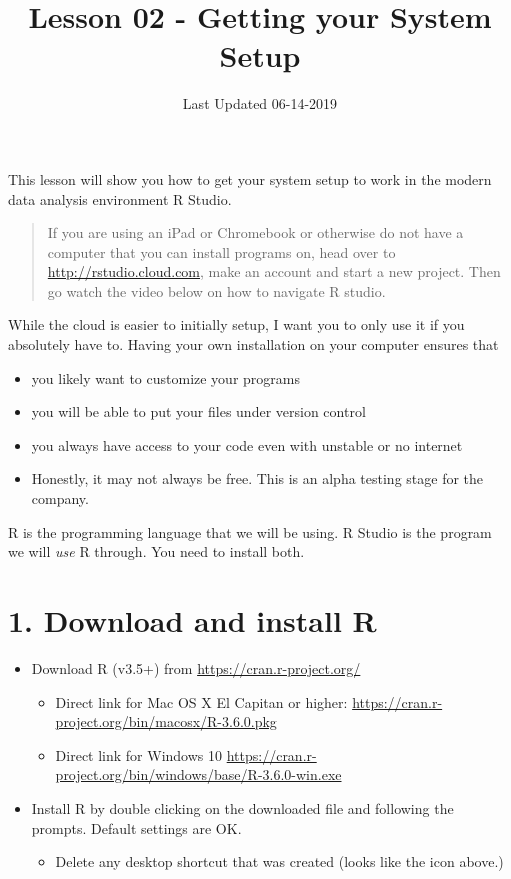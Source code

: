 \documentclass[]{article}
\title{Lesson 02 - Getting your System Setup}
\author{}
\date{Last Updated 06-14-2019}
\providecommand{\tightlist}{%
  \setlength{\itemsep}{0pt}\setlength{\parskip}{0pt}}
\begin{document}
\maketitle

This lesson will show you how to get your system setup to work in the
modern data analysis environment R Studio.

\begin{quote}
If you are using an iPad or Chromebook or otherwise do not have a
computer that you can install programs on, head over to
\url{http://rstudio.cloud.com}, make an account and start a new project.
Then go watch the video below on how to navigate R studio.
\end{quote}

While the cloud is easier to initially setup, I want you to only use it
if you absolutely have to. Having your own installation on your computer
ensures that

\begin{itemize}
\tightlist
\item
  you likely want to customize your programs
\item
  you will be able to put your files under version control
\item
  you always have access to your code even with unstable or no internet
\item
  Honestly, it may not always be free. This is an alpha testing stage
  for the company.
\end{itemize}

R is the programming language that we will be using. R Studio is the
program we will \emph{use} R through. You need to install both.

\hypertarget{download-and-install-r}{%
\section{1. Download and install R}\label{download-and-install-r}}

\begin{itemize}
\tightlist
\item
  Download R (v3.5+) from \url{https://cran.r-project.org/}

  \begin{itemize}
  \tightlist
  \item
    Direct link for Mac OS X El Capitan or higher:
    \url{https://cran.r-project.org/bin/macosx/R-3.6.0.pkg}
  \item
    Direct link for Windows 10
    \url{https://cran.r-project.org/bin/windows/base/R-3.6.0-win.exe}
  \end{itemize}
\item
  Install R by double clicking on the downloaded file and following the
  prompts. Default settings are OK.

  \begin{itemize}
  \tightlist
  \item
    Delete any desktop shortcut that was created (looks like the icon
    above.)
  \end{itemize}
\end{itemize}
\end{document}
